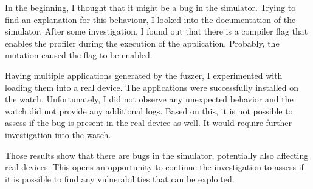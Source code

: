 In the beginning, I thought that it might be a bug in the simulator.
Trying to find an explanation for this behaviour, I looked into the documentation of the simulator.
After some investigation, I found out that there is a compiler flag that enables the profiler during the execution of the application.
Probably, the mutation caused the flag to be enabled.

Having multiple applications generated by the fuzzer, I experimented with loading them into a real device.
The applications were successfully installed on the watch.
Unfortunately, I did not observe any unexpected behavior and the watch did not provide any additional logs.
Based on this, it is not possible to assess if the bug is present in the real device as well.
It would require further investigation into the watch.

Those results show that there are bugs in the simulator, potentially also affecting real devices.
This opens an opportunity to continue the investigation to assess if it is possible to find any vulnerabilities that can be exploited.
